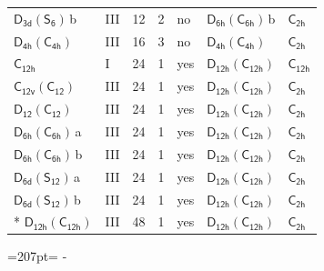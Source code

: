 \documentclass[10pt,a4paper]{article}
\newcommand{\needspace}[1]{\par\penalty-100\begingroup\dimen0=#1\relax\dimen2=\pagegoal
  \advance\dimen2-\pagetotal\ifdim\dimen0>\dimen2\relax\ifdim\dimen2>0pt\vfil\break\fi\fi
  \endgroup}
\numberwithin{equation}{section}
\newcommand{\grp}[1]{\mathsf{#1}}
\newcommand{\clsletter}[1]{\,{\scriptsize\color{black!55}#1}}
\begin{document}
{\begin{longtable}{@{}llrrlll@{}}
\href{D3d-S6.pdf}{$\grp{D_{3d}}(\grp{S_{6}})$}\clsletter{b} & III & 12 & 2 & no & \href{D6h-C6h.pdf}{$\grp{D_{6h}}(\grp{C_{6h}})$}\clsletter{b} & \href{../../../rotation/data/pdf/C2h.pdf}{$\grp{C_{2h}}$}\\
\href{D4h-C4h.pdf}{$\grp{D_{4h}}(\grp{C_{4h}})$} & III & 16 & 3 & no & \href{D4h-C4h.pdf}{$\grp{D_{4h}}(\grp{C_{4h}})$} & \href{../../../rotation/data/pdf/C2h.pdf}{$\grp{C_{2h}}$}\\
\href{../../../rotation/data/pdf/C12h.pdf}{$\grp{C_{12h}}$} & I & 24 & 1 & yes & \href{D12h-C12h.pdf}{$\grp{D_{12h}}(\grp{C_{12h}})$} & \href{../../../rotation/data/pdf/C12h.pdf}{$\grp{C_{12h}}$}\\
\href{C12v-C12.pdf}{$\grp{C_{12v}}(\grp{C_{12}})$} & III & 24 & 1 & yes & \href{D12h-C12h.pdf}{$\grp{D_{12h}}(\grp{C_{12h}})$} & \href{../../../rotation/data/pdf/C2h.pdf}{$\grp{C_{2h}}$}\\
\href{D12-C12.pdf}{$\grp{D_{12}}(\grp{C_{12}})$} & III & 24 & 1 & yes & \href{D12h-C12h.pdf}{$\grp{D_{12h}}(\grp{C_{12h}})$} & \href{../../../rotation/data/pdf/C2h.pdf}{$\grp{C_{2h}}$}\\
\href{D6h-C6h.pdf}{$\grp{D_{6h}}(\grp{C_{6h}})$}\clsletter{a} & III & 24 & 1 & yes & \href{D12h-C12h.pdf}{$\grp{D_{12h}}(\grp{C_{12h}})$} & \href{../../../rotation/data/pdf/C2h.pdf}{$\grp{C_{2h}}$}\\
\href{D6h-C6h.pdf}{$\grp{D_{6h}}(\grp{C_{6h}})$}\clsletter{b} & III & 24 & 1 & yes & \href{D12h-C12h.pdf}{$\grp{D_{12h}}(\grp{C_{12h}})$} & \href{../../../rotation/data/pdf/C2h.pdf}{$\grp{C_{2h}}$}\\
\href{D6d-S12.pdf}{$\grp{D_{6d}}(\grp{S_{12}})$}\clsletter{a} & III & 24 & 1 & yes & \href{D12h-C12h.pdf}{$\grp{D_{12h}}(\grp{C_{12h}})$} & \href{../../../rotation/data/pdf/C2h.pdf}{$\grp{C_{2h}}$}\\
\href{D6d-S12.pdf}{$\grp{D_{6d}}(\grp{S_{12}})$}\clsletter{b} & III & 24 & 1 & yes & \href{D12h-C12h.pdf}{$\grp{D_{12h}}(\grp{C_{12h}})$} & \href{../../../rotation/data/pdf/C2h.pdf}{$\grp{C_{2h}}$}\\*
\href{D12h-C12h.pdf}{$\grp{D_{12h}}(\grp{C_{12h}})$} & III & 48 & 1 & yes & \href{D12h-C12h.pdf}{$\grp{D_{12h}}(\grp{C_{12h}})$} & \href{../../../rotation/data/pdf/C2h.pdf}{$\grp{C_{2h}}$}\\
\bottomrule\end{longtable}}
\needspace{207pt}
\end{document}
